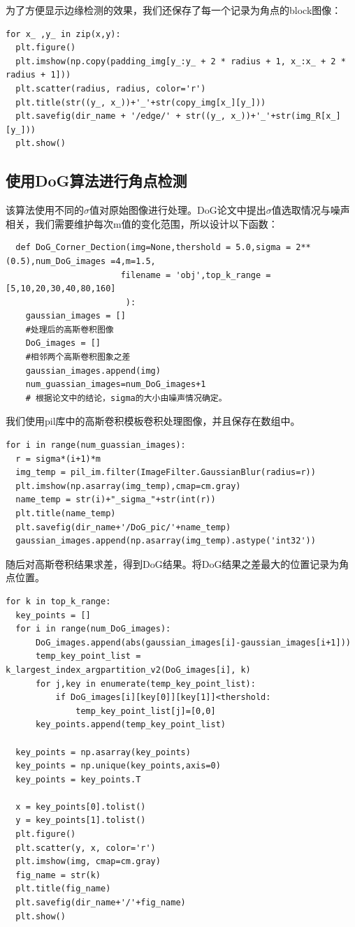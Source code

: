 \documentclass[a4paper,11pt,UTF8]{ctexart}
\begin{document}
为了方便显示边缘检测的效果，我们还保存了每一个记录为角点的block图像：
\begin{lstlisting}
for x_ ,y_ in zip(x,y):
  plt.figure()
  plt.imshow(np.copy(padding_img[y_:y_ + 2 * radius + 1, x_:x_ + 2 * radius + 1]))
  plt.scatter(radius, radius, color='r')
  plt.title(str((y_, x_))+'_'+str(copy_img[x_][y_]))
  plt.savefig(dir_name + '/edge/' + str((y_, x_))+'_'+str(img_R[x_][y_]))
  plt.show()
\end{lstlisting}

\subsection{使用DoG算法进行角点检测}
该算法使用不同的$\sigma$值对原始图像进行处理。DoG论文中提出$\sigma$值选取情况与噪声相关，我们需要维护每次m值的变化范围，所以设计以下函数：
\begin{lstlisting}
  def DoG_Corner_Dection(img=None,thershold = 5.0,sigma = 2**(0.5),num_DoG_images =4,m=1.5,
                       filename = 'obj',top_k_range = [5,10,20,30,40,80,160]
                        ):
    gaussian_images = []
    #处理后的高斯卷积图像
    DoG_images = []
    #相邻两个高斯卷积图象之差
    gaussian_images.append(img)
    num_guassian_images=num_DoG_images+1
    # 根据论文中的结论，sigma的大小由噪声情况确定。
\end{lstlisting}

我们使用pil库中的高斯卷积模板卷积处理图像，并且保存在数组中。
\begin{lstlisting}
for i in range(num_guassian_images):
  r = sigma*(i+1)*m
  img_temp = pil_im.filter(ImageFilter.GaussianBlur(radius=r))
  plt.imshow(np.asarray(img_temp),cmap=cm.gray)
  name_temp = str(i)+"_sigma_"+str(int(r))
  plt.title(name_temp)
  plt.savefig(dir_name+'/DoG_pic/'+name_temp)
  gaussian_images.append(np.asarray(img_temp).astype('int32'))
\end{lstlisting}

随后对高斯卷积结果求差，得到DoG结果。将DoG结果之差最大的位置记录为角点位置。
\begin{lstlisting}
for k in top_k_range:
  key_points = []
  for i in range(num_DoG_images):
      DoG_images.append(abs(gaussian_images[i]-gaussian_images[i+1]))
      temp_key_point_list = k_largest_index_argpartition_v2(DoG_images[i], k)
      for j,key in enumerate(temp_key_point_list):
          if DoG_images[i][key[0]][key[1]]<thershold:
              temp_key_point_list[j]=[0,0]
      key_points.append(temp_key_point_list)

  key_points = np.asarray(key_points)
  key_points = np.unique(key_points,axis=0)
  key_points = key_points.T

  x = key_points[0].tolist()
  y = key_points[1].tolist()
  plt.figure()
  plt.scatter(y, x, color='r')
  plt.imshow(img, cmap=cm.gray)
  fig_name = str(k)
  plt.title(fig_name)
  plt.savefig(dir_name+'/'+fig_name)
  plt.show()
\end{lstlisting}
\end{document}
